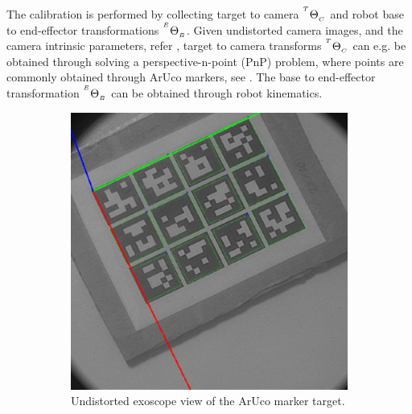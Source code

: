 The calibration is performed by collecting target to camera ${}^{^T}\Theta_{_C}$ and robot base to end-effector transformations ${}^{^E}\Theta_{_B}$. Given undistorted camera images, and the camera intrinsic parameters, refer , target to camera transforms ${}^{^T}\Theta_{_C}$ can e.g. be obtained through solving a perspective-n-point (PnP) problem, where points are commonly obtained through ArUco markers, see . The base to end-effector transformation ${}^{^E}\Theta_{_B}$ can be obtained through robot kinematics.
\begin{figure}[htb]
    \centering
    \begin{subfigure}[b]{0.49\textwidth}
        \centering
        \includegraphics[width=\textwidth]{introduction/img/aruco.png}
        \caption{Undistorted exoscope view of the ArUco marker target.}
    \end{subfigure}
    \begin{subfigure}[b]{0.49\textwidth}
        \centering

\end{subfigure}
\end{figure}
